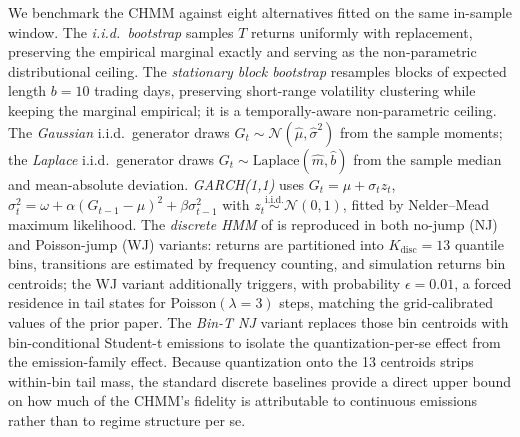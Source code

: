 We benchmark the CHMM against eight alternatives fitted on the same in-sample window.
The \textit{i.i.d.\ bootstrap} samples $T$ returns uniformly with replacement, preserving the empirical marginal exactly and serving as the non-parametric distributional ceiling.
The \textit{stationary block bootstrap} \cite{politis1994stationary} resamples blocks of expected length $b = 10$ trading days, preserving short-range volatility clustering while keeping the marginal empirical; it is a temporally-aware non-parametric ceiling.
The \textit{Gaussian} i.i.d.\ generator draws $G_t \sim \mathcal{N}(\hat\mu, \hat\sigma^2)$ from the sample moments; the \textit{Laplace} i.i.d.\ generator draws $G_t \sim \text{Laplace}(\hat m, \hat b)$ from the sample median and mean-absolute deviation.
\textit{GARCH(1,1)} \cite{bollerslev1986generalized} uses $G_t = \mu + \sigma_t z_t$, $\sigma_t^2 = \omega + \alpha(G_{t-1} - \mu)^2 + \beta \sigma_{t-1}^2$ with $z_t \overset{\text{i.i.d.}}{\sim} \mathcal{N}(0, 1)$, fitted by Nelder--Mead maximum likelihood.
\label{sec:discrete_hmm}%
The \textit{discrete HMM} of \citet{alswaidan2026hybrid} is reproduced in both no-jump (NJ) and Poisson-jump (WJ) variants: returns are partitioned into $K_{\text{disc}} = 13$ quantile bins, transitions are estimated by frequency counting, and simulation returns bin centroids; the WJ variant additionally triggers, with probability $\epsilon = 0.01$, a forced residence in tail states for Poisson$(\lambda = 3)$ steps, matching the grid-calibrated values of the prior paper.
The \textit{Bin-T NJ} variant replaces those bin centroids with bin-conditional Student-t emissions to isolate the quantization-per-se effect from the emission-family effect.
Because quantization onto the 13 centroids strips within-bin tail mass, the standard discrete baselines provide a direct upper bound on how much of the CHMM's fidelity is attributable to continuous emissions rather than to regime structure per se.

